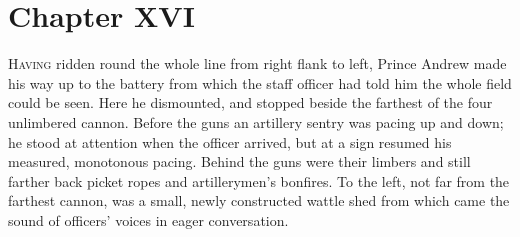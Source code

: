 \chapter*{Chapter XVI}
\ifaudio     {} \fi

\lettrine[lines=2, loversize=0.3, lraise=0]{\initfamily H}{aving}
ridden round the whole line from right flank to left,
Prince Andrew made his way up to the battery from which the staff
officer had told him the whole field could be seen. Here he
dismounted, and stopped beside the farthest of the four
unlimbered cannon. Before the guns an artillery sentry was pacing
up and down; he stood at attention when the officer arrived, but
at a sign resumed his measured, monotonous pacing.  Behind the
guns were their limbers and still farther back picket ropes and
artillerymen's bonfires. To the left, not far from the farthest
cannon, was a small, newly constructed wattle shed from which
came the sound of officers' voices in eager conversation.

